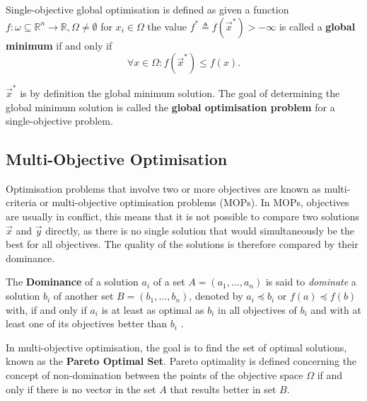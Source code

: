 \begin{definition}
    Single-objective global optimisation is defined as given a function $f: \omega \subseteq \mathbb{R}^n \rightarrow \mathbb{R}, \Omega \neq \emptyset$ for $x_i \in \Omega$ the value $f^* \triangleq f(\vec{x}^*) > -\infty$ is called a \textbf{global minimum} if and only if\\
    
    \begin{equation}
        \forall x \in \Omega: f(\vec{x}^*) \leq f(x).
    \end{equation}
\end{definition}

$\vec{x}^*$ is by definition the global minimum solution. The goal of determining the global minimum solution is called the \textbf{global optimisation problem} for a single-objective problem.\\

\subsection{Multi-Objective Optimisation}

Optimisation problems that involve two or more objectives are
known as multi-criteria or multi-objective optimisation problems (MOPs).
In MOPs, objectives are usually in conflict, this means that it is not possible to compare two solutions $\vec{x}$ and $\vec{y}$ directly, as there is no single solution that would simultaneously be the best for all objectives. The quality of the solutions is therefore compared by their dominance.\\

\begin{definition}
    The \textbf{Dominance} of a solution $a_i$ of a set $A = (a_1,...,a_n)$ is said to \textit{dominate} a solution $b_i$ of another set $B = (b_1,...,b_n)$, denoted by $a_i \preceq b_i$ or $f(a) \preceq f(b)$ with, if and only if $a_i$ is at least as optimal as $b_i$ in all objectives of $b_i$ and with at least one of its objectives better than $b_i$ \cite{back1997handbook}.
\end{definition}

In multi-objective optimisation, the goal is to find the set of optimal solutions, known as the \textbf{Pareto Optimal Set}. Pareto optimality is defined concerning the concept of non-domination between the points of the objective space $\Omega$ if and only if there is no vector in the set $A$ that results better in set $B$.

